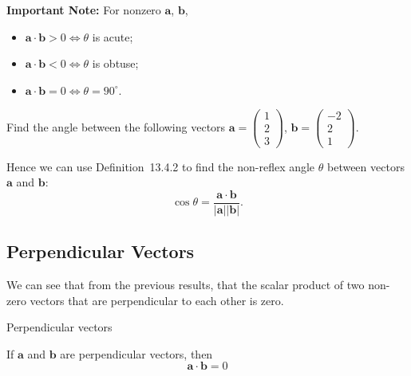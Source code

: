 \documentclass[a4paper]{book}
\newcommand{\cvv}[3]{\begin{pmatrix}#1\\#2\\#3\end{pmatrix}}
\begin{document}
\begin{info}
\textbf{Important Note:} For nonzero $\mathbf a$, $\mathbf b$,
\begin{itemize}
\item $\mathbf a\cdot\mathbf b>0\iff\theta$ is acute;
\item $\mathbf a\cdot\mathbf b<0\iff\theta$ is obtuse;
\item $\mathbf a\cdot\mathbf b=0\iff\theta=90^\circ$.
\end{itemize}
\end{info}

\begin{example}
Find the angle between the following vectors $\mathbf a=\cvv{1}{2}{3}$, $\mathbf b=\cvv{-2}{2}{1}$.
\end{example}
\solution{
\[
\begin{aligned}
\mathbf a\cdot\mathbf b&=|\mathbf a||\mathbf b|\cos\theta\\
\cvv{1}{2}{3}\cdot\cvv{-2}{2}{1}&=\left|\cvv{1}{2}{3}\right|\left|\cvv{-2}{2}{1}\right|\cos\theta\\
-2+4+3&=\sqrt{14}\sqrt9\cos\theta\\
\frac{5}{3\sqrt{14}}&=\cos\theta\\
\theta&=\cos^{-1}\left(\frac{5}{3\sqrt{14}}\right)\\
\theta&=63.5^\circ
\end{aligned}
\]}

Hence we can use Definition~13.4.2 to find the non-reflex angle $\theta$ between vectors $\mathbf a$ and $\mathbf b$:
\[
\cos\theta=\frac{\mathbf a\cdot\mathbf b}{|\mathbf a||\mathbf b|}.
\]


\subsection{Perpendicular Vectors}
We can see that from the previous results, that the scalar product of two non-zero vectors that are perpendicular to each other is zero.

\begin{theorem}{Perpendicular vectors}
\begin{center}
\end{center}
\begin{center}
If $\mathbf a$ and $\mathbf b$ are perpendicular vectors, then
\[
\mathbf a\cdot\mathbf b=0
\]
\end{center}
\end{theorem}
\end{document}
